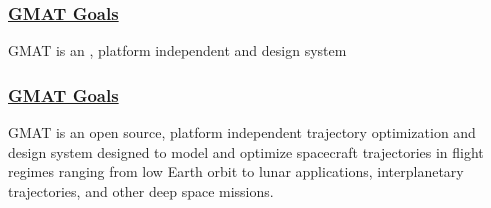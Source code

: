 \begin{frame}\frametitle{\href{https://opensource.gsfc.nasa.gov/projects/GMAT/index.php}{GMAT Goals}}
\center
GMAT is an , platform independent   and design system
 \end{frame}

\begin{frame}\frametitle{\href{https://opensource.gsfc.nasa.gov/projects/GMAT/index.php}{GMAT Goals}}
\center
GMAT is an open source, platform independent trajectory optimization and design system designed to model and optimize spacecraft trajectories in flight regimes ranging from low Earth orbit to lunar applications, interplanetary trajectories, and other deep space missions.
 \end{frame}


\endinput  %
